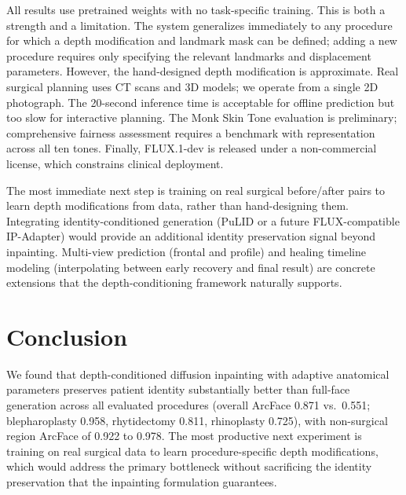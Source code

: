 \documentclass[twocolumn]{article}
\begin{document}
All results use pretrained weights with no task-specific training. This
is both a strength and a limitation. The system generalizes immediately
to any procedure for which a depth modification and landmark mask can be
defined; adding a new procedure requires only specifying the relevant
landmarks and displacement parameters. However, the hand-designed depth
modification is approximate. Real surgical planning uses CT scans and 3D
models; we operate from a single 2D photograph. The 20-second inference
time is acceptable for offline prediction but too slow for interactive
planning. The Monk Skin Tone evaluation is preliminary; comprehensive
fairness assessment requires a benchmark with representation across all
ten tones. Finally, FLUX.1-dev is released under a non-commercial
license, which constrains clinical deployment.

The most immediate next step is training on real surgical before/after
pairs to learn depth modifications from data, rather than hand-designing
them. Integrating identity-conditioned generation (PuLID or a future
FLUX-compatible IP-Adapter) would provide an additional identity
preservation signal beyond inpainting. Multi-view prediction (frontal and
profile) and healing timeline modeling (interpolating between early
recovery and final result) are concrete extensions that the
depth-conditioning framework naturally supports.

\section{Conclusion}
\label{sec:conclusion}

We found that depth-conditioned diffusion inpainting with adaptive
anatomical parameters preserves patient identity substantially better
than full-face generation across all evaluated procedures (overall
ArcFace 0.871 vs.\ 0.551; blepharoplasty 0.958, rhytidectomy 0.811,
rhinoplasty 0.725), with non-surgical region ArcFace of 0.922 to 0.978. The most productive next
experiment is training on real surgical data to learn procedure-specific
depth modifications, which would address the primary bottleneck without
sacrificing the identity preservation that the inpainting formulation
guarantees.

\end{document}
